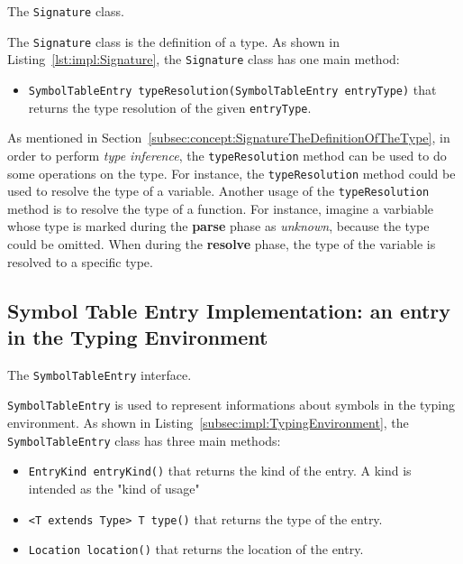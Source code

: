 \begin{Listing}[tbh]
    \centering
    \caption{The \texttt{Signature} class.}
    \label{lst:impl:Signature}
\end{Listing}

The \texttt{Signature} class is the definition of a type. As shown in Listing~\ref{lst:impl:Signature}, the \texttt{Signature} class has one main method:
\begin{itemize}
    \item \texttt{SymbolTableEntry typeResolution(SymbolTableEntry entryType)} that returns the type resolution of the given \texttt{entryType}.
\end{itemize}

As mentioned in Section~\ref{subsec:concept:SignatureTheDefinitionOfTheType}, in order to perform \textit{type inference}, the \texttt{typeResolution} method can be used to do some operations on the type. For instance, the \texttt{typeResolution} method could be used to resolve the type of a variable. Another usage of the \texttt{typeResolution} method is to resolve the type of a function. For instance, imagine a varbiable whose type is marked during the \textbf{parse} phase as \textit{unknown}, because the type could be omitted. When during the \textbf{resolve} phase, the type of the variable is resolved to a specific type.

\subsection{Symbol Table Entry Implementation: an entry in the Typing Environment}\label{subsec:impl:SymbolTableEntry}
\begin{Listing}[tbh]
    \centering
    \caption{The \texttt{SymbolTableEntry} interface.}
    \label{lst:impl:SymbolTableEntry}
\end{Listing}

\texttt{SymbolTableEntry} is used to represent informations about symbols in the typing environment. As shown in Listing~\ref{subsec:impl:TypingEnvironment}, the \texttt{SymbolTableEntry} class has three main methods:

\begin{itemize}
    \item \texttt{EntryKind entryKind()} that returns the kind of the entry. A kind is intended as the "kind of usage"
    \item \texttt{<T extends Type> T type()} that returns the type of the entry.
    \item \texttt{Location location()} that returns the location of the entry.
\end{itemize}

